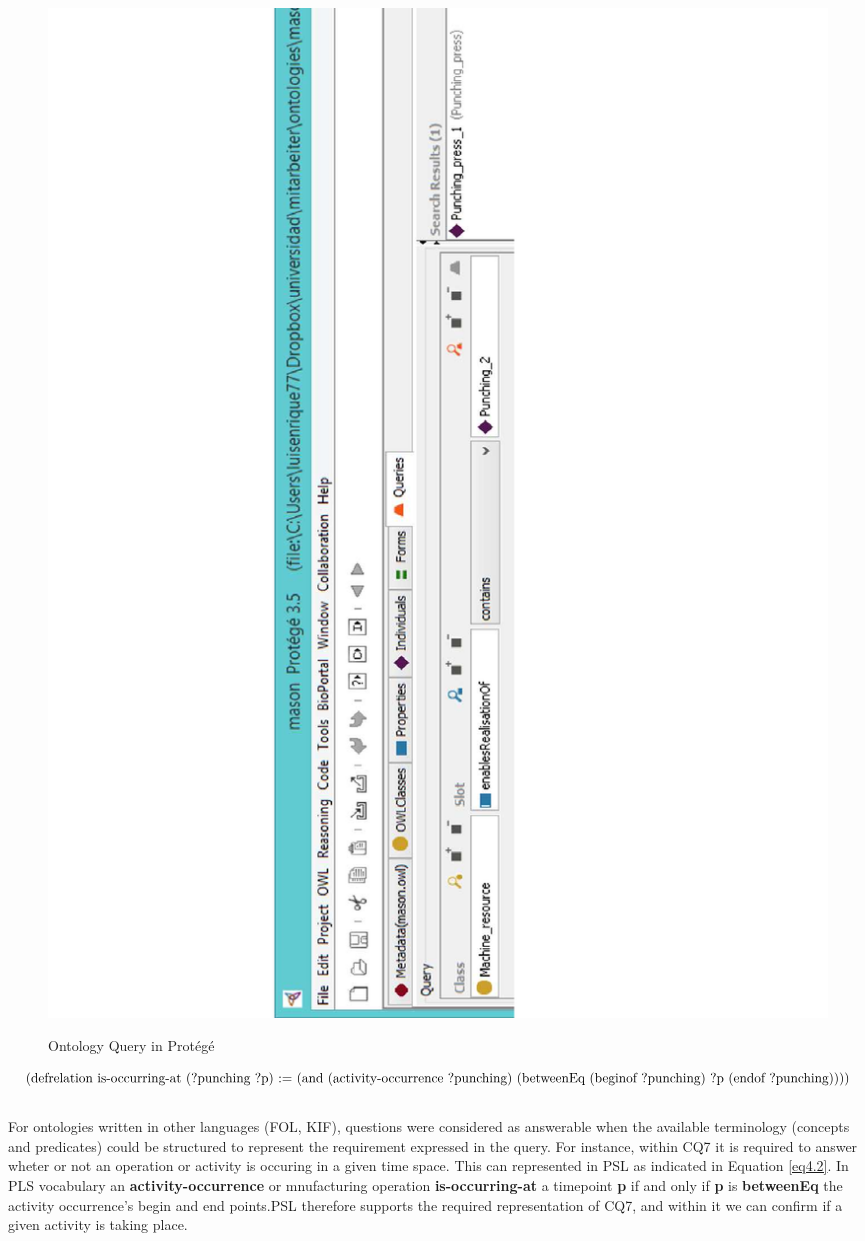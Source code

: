 \begin{figure}
	\begin{center}
		\includegraphics[scale=0.8]{figure-chapterIV/fig4-5}\\
		\caption{Ontology Query in Protégé}
		\label{figure4-5}
	\end{center}
\end{figure}


\begin{equation}\label{eq4.2}
	$
	(defrelation is-occurring-at (?punching ?p) :=
	(and (activity-occurrence ?punching)
	(betweenEq (beginof ?punching) ?p (endof ?punching))))
	$
\end{equation}\\

For ontologies written in other languages (FOL, KIF), questions were considered as answerable when the available terminology (concepts and predicates) could be structured to represent the requirement expressed in the query. \cbstart For instance,   within CQ7 it is required to answer wheter or not an operation or activity is occuring in a given time space. This can represented in PSL as indicated in Equation \ref{eq4.2}. In PLS vocabulary an \textbf{activity-occurrence} or mnufacturing operation \textbf{is-occurring-at} a timepoint \textbf{p} if and only if \textbf{p} is \textbf{betweenEq} the activity occurrence’s begin and end points.PSL therefore supports the required representation of CQ7, and within it we can confirm if a given activity is taking place.\cbend 




